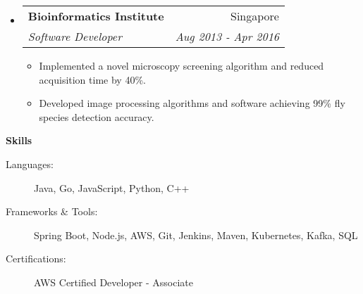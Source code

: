 \documentclass[letterpaper,11pt]{article}
\makeatletter
\newcommand{\resitem}[1]{\item #1 \vspace{-2pt}}
\newcommand{\resheading}[1]{{\large \colorbox{mygrey}{\begin{minipage}{\textwidth}{\textbf{#1 \vphantom{p\^{E}}}}\end{minipage}}}}
\newcommand{\ressubheading}[4]{
\begin{tabular*}{7.0in}{l@{\extracolsep{\fill}}r}
		\textbf{#1} & #2 \\
		\textit{#3} & \textit{#4} \\
\end{tabular*}\vspace{-6pt}}
\makeatother
\begin{document}
\begin{itemize}
\item
	\ressubheading{Bioinformatics Institute}{Singapore}{Software Developer}{Aug 2013 - Apr 2016}
	\begin{itemize}
		\resitem{Implemented a novel microscopy screening algorithm and reduced acquisition time by 40\%.}
		\resitem{Developed image processing algorithms and software achieving 99\% fly species detection accuracy.}
	\end{itemize}

\vspace{0.1in}
\end{itemize}

\resheading{Skills}
\begin{description}
\item[Languages:] Java, Go, JavaScript, Python, C++
\item[Frameworks \& Tools:] Spring Boot, Node.js, AWS, Git, Jenkins, Maven, Kubernetes,  Kafka, SQL
\item[Certifications:] AWS Certified Developer - Associate
\end{description}
\end{document}
